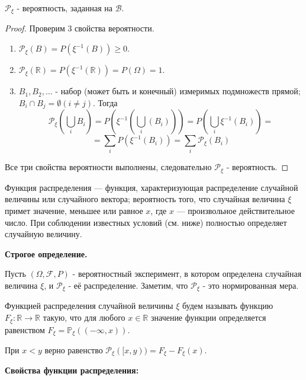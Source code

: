 \begin{theorem}
	$\mathcal{P}_{\xi}$ - вероятность, заданная на $\mathcal{B}$.
	\begin{proof}
		Проверим 3 свойства вероятности.
		\begin{enumerate}
			\item $\mathcal{P}_{\xi} (B) = P(\xi^{-1} (B)) \ge 0$.
			\item $\mathcal{P}_{\xi} (\mathbb{R}) = P(\xi^{-1} (\mathbb{R})) = P(\Omega) = 1$.
			\item $B_1, B_2, \dots$ - набор (может быть и конечный) измеримых подмножеств прямой; $B_i \cap B_j = \emptyset (i \ne j)$. Тогда
			\[ \mathcal{P}_{\xi} \left( \bigcup_i B_i \right) = P \left( \xi^{-1} \left( \bigcup_i (B_i) \right) \right) = P \left( \bigcup_i \xi^{-1} (B_i) \right) = \]
			\[ = \sum_{i} P(\xi^{-1} (B_i)) = \sum_{i} \mathcal{P}_{\xi} (B_i) \]
		\end{enumerate}
		Все три свойства вероятности выполнены, следовательно $\mathcal{P}_{\xi}$ - вероятность.
	\end{proof}
\end{theorem}

\begin{definition}
	Функция распределения — функция, характеризующая распределение случайной величины или случайного вектора; вероятность того, что случайная величина $\xi$ примет значение, меньшее или равное $x$, где $x$ — произвольное действительное число. При соблюдении известных условий (см. ниже) полностью определяет случайную величину.
	
	\textbf{Строгое определение.}
	
	Пусть $(\Omega, \mathcal{F}, P)$ - вероятностный эксперимент, в котором определена случайная величина $\xi$, и $\mathcal{P}_{\xi}$ - её распределение. Заметим, что $\mathcal{P}_{\xi}$ - это нормированная мера.
	
	Функцией распределения случайной величины $\xi$ будем называть функцию $F_{\xi}: \mathbb{R} \to \mathbb{R}$ такую, что для любого $x \in \mathbb{R}$ значение функции определяется равенством $F_{\xi} = \mathbb{P}_{\xi} ( (-\infty, x) )$.
\end{definition}

\begin{remark}
	При $x < y$ верно равенство $\mathcal{P}_{\xi} ( [x, y) ) = F_{\xi} - F_{\xi} (x)$.
\end{remark}

\textbf{Свойства функции распределения:}


